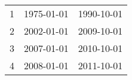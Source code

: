 % 
\begin{tabular}{ccc}
  \hline
  \hline
1 & 1975-01-01 & 1990-10-01 \\ 
  2 & 2002-01-01 & 2009-10-01 \\ 
  3 & 2007-01-01 & 2010-10-01 \\ 
  4 & 2008-01-01 & 2011-10-01 \\ 
   \hline
\end{tabular}

